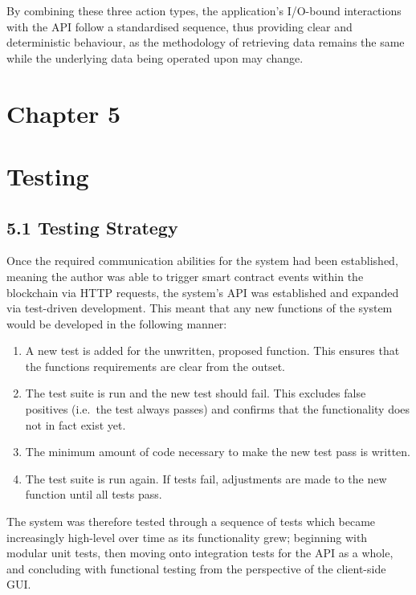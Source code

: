 \documentclass[12pt]{report}
\providecommand{\tightlist}{%
  \setlength{\itemsep}{0pt}\setlength{\parskip}{0pt}}
\begin{document}
By combining these three action types, the application's I/O-bound
interactions with the API follow a standardised sequence, thus providing
clear and deterministic behaviour, as the methodology of retrieving data
remains the same while the underlying data being operated upon may
change.

\section{Chapter 5}\label{chapter-5-1}

\section{Testing}\label{testing-1}

\subsection{5.1 Testing Strategy}\label{testing-strategy}

Once the required communication abilities for the system had been
established, meaning the author was able to trigger smart contract
events within the blockchain via HTTP requests, the system's API was
established and expanded via test-driven development. This meant that
any new functions of the system would be developed in the following
manner\cite{beck2003test}:

\begin{enumerate}
\def\labelenumi{\arabic{enumi}.}
\tightlist
\item
  A new test is added for the unwritten, proposed function. This ensures
  that the functions requirements are clear from the outset.
\item
  The test suite is run and the new test should fail. This excludes
  false positives (i.e.~the test always passes) and confirms that the
  functionality does not in fact exist yet.
\item
  The minimum amount of code necessary to make the new test pass is
  written.
\item
  The test suite is run again. If tests fail, adjustments are made to
  the new function until all tests pass.
\end{enumerate}

The system was therefore tested through a sequence of tests which became
increasingly high-level over time as its functionality grew; beginning
with modular unit tests, then moving onto integration tests for the API
as a whole, and concluding with functional testing from the perspective
of the client-side GUI.
\end{document}

